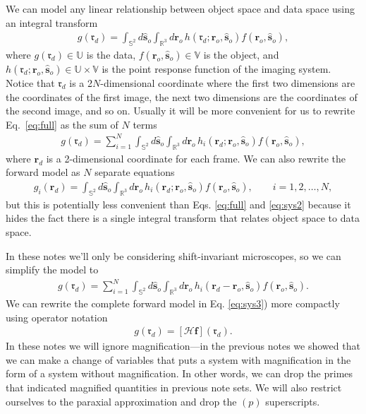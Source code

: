 \documentclass[11pt]{article}
\providecommand{\ro}[1]{\mathbf{\mathbf{r}}_o}
\providecommand{\so}[1]{\mathbf{\hat{s}}_o}
\providecommand{\rd}[1]{\mathbf{r}_d}
\providecommand{\mbb}[1]{\mathbb{#1}}
\begin{document}
We can model any linear relationship between object space and data space using
an integral transform
\begin{align}
  g(\mathfrak{r}_d) = \int_{\mbb{S}^2}d\so{}\int_{\mbb{R}^3}d\ro{}\, h(\mathfrak{r}_d; \ro{}, \so{})f(\ro{}, \so{}), \label{eq:full}
\end{align}
where $g(\mathfrak{r}_d) \in \mbb{U}$ is the data, $f(\ro{}, \so{}) \in \mbb{V}$
is the object, and $h(\mathfrak{r}_d; \ro{}, \so{}) \in \mbb{U} \times \mbb{V}$ is
the point response function of the imaging system. Notice that $\mathfrak{r}_d$
is a 2$N$-dimensional coordinate where the first two dimensions are the
coordinates of the first image, the next two dimensions are the coordinates of
the second image, and so on. Usually it will be more convenient for us to
rewrite Eq.~\ref{eq:full} as the sum of $N$ terms
\begin{align}
    g(\mathfrak{r}_d) = \sum_{i=1}^N \int_{\mbb{S}^2}d\so{}\int_{\mbb{R}^3}d\ro{}\, h_i(\rd{}; \ro{}, \so{})f(\ro{}, \so{}), \label{eq:sys2}
\end{align}
where $\rd{}$ is a 2-dimensional coordinate for each frame. We can also rewrite
the forward model as $N$ separate equations
\begin{align}
    g_i(\rd{}) = \int_{\mbb{S}^2}d\so{}\int_{\mbb{R}^3}d\ro{}\, h_i(\rd{}; \ro{}, \so{})f(\ro{}, \so{}),\qquad i=1, 2,\ldots,N, \label{eq:system}
\end{align}
but this is potentially less convenient than Eqs. \ref{eq:full} and
\ref{eq:sys2} because it hides the fact there is a single integral transform
that relates object space to data space.

In these notes we'll only be considering shift-invariant microscopes, so we can
simplify the model to
\begin{align}
    g(\mathfrak{r}_d) = \sum_{i=1}^N \int_{\mbb{S}^2}d\so{}\int_{\mbb{R}^3}d\ro{}\, h_i(\rd{} - \ro{}, \so{})f(\ro{}, \so{}). \label{eq:sys3}
\end{align}
We can rewrite the complete forward model in Eq. \ref{eq:sys3}) more compactly
using operator notation
\begin{align}
  g(\mathfrak{r}_d) = [\mathcal{H}\mathbf{f}](\mathfrak{r}_d).
\end{align}
In these notes we will ignore magnification---in the previous notes we showed
that we can make a change of variables that puts a system with magnification in
the form of a system without magnification. In other words, we can drop the
primes that indicated magnified quantities in previous note sets. We will also
restrict ourselves to the paraxial approximation and drop the $(p)$
superscripts.
\end{document}

